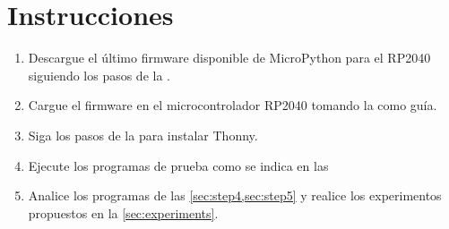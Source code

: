 %
%


\section{Instrucciones}%
\label{sec:instructions}
\begin{enumerate}[noitemsep]
	\item Descargue el último firmware disponible de MicroPython para el RP2040 siguiendo los pasos de la .
	\item Cargue el firmware en el microcontrolador RP2040 tomando la  como guía.
	\item Siga los pasos de la  para instalar Thonny.
	\item Ejecute los programas de prueba como se indica en las 
 	\item Analice los programas de las \cref{sec:step4,sec:step5} y realice los experimentos propuestos en la \cref{sec:experiments}.
\end{enumerate}






